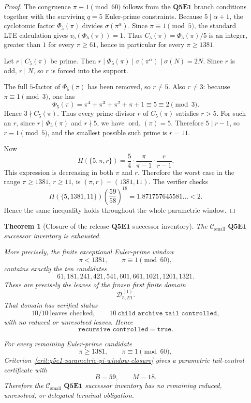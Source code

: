 \documentclass[11pt]{article}
\newtheorem{theorem}{Theorem}[section]
\theoremstyle{definition}
\theoremstyle{remark}
\newcommand{\Csmall}{\ensuremath{\mathcal C_{\mathrm{small}}}}
\begin{document}
\begin{proof}
The congruence \(\pi\equiv1\pmod{60}\) follows from the \(\mathbf{Q5E1}\)
branch conditions together with the surviving \(q=5\) Euler-prime constraints.
Because \(5\mid\alpha+1\), the cyclotomic factor \(\Phi_5(\pi)\) divides
\(\sigma(\pi^\alpha)\).  Since \(\pi\equiv1\pmod5\), the standard LTE
calculation gives \(v_5(\Phi_5(\pi))=1\).  Thus
\(C_5(\pi)=\Phi_5(\pi)/5\) is an integer, greater than \(1\) for every
\(\pi\ge61\), hence in particular for every \(\pi\ge1381\).

Let \(r\mid C_5(\pi)\) be prime.  Then
\(r\mid\Phi_5(\pi)\mid\sigma(\pi^\alpha)\mid\sigma(N)=2N\).  Since \(r\) is
odd, \(r\mid N\), so \(r\) is forced into the support.

The full \(5\)-factor of \(\Phi_5(\pi)\) has been removed, so \(r\ne5\).
Also \(r\ne3\): because \(\pi\equiv1\pmod3\), one has
\[
  \Phi_5(\pi)
  =
  \pi^4+\pi^3+\pi^2+\pi+1
  \equiv
  5
  \equiv2
  \pmod3.
\]
Hence
\(3\nmid C_5(\pi)\).  Thus every prime divisor \(r\) of \(C_5(\pi)\) satisfies
\(r>5\).  For such an \(r\), since \(r\mid\Phi_5(\pi)\) and \(r\nmid5\), we
have \(\operatorname{ord}_r(\pi)=5\).  Therefore \(5\mid r-1\), so
\(r\equiv1\pmod5\), and the smallest possible such prime is \(r=11\).

Now
\[
  H(\{5,\pi,r\})
  =
  \frac54\cdot\frac{\pi}{\pi-1}\cdot\frac{r}{r-1}.
\]
This expression is decreasing in both \(\pi\) and \(r\).  Therefore the worst
case in the range \(\pi\ge1381\), \(r\ge11\), is \((\pi,r)=(1381,11)\).
The verifier checks
\[
  H(\{5,1381,11\})
  \left(\frac{59}{58}\right)^{18}
  =
  1.871757645581\ldots
  <2.
\]
Hence the same inequality holds throughout the whole parametric window.
\end{proof}

\begin{theorem}[Closure of the release \texorpdfstring{\(\mathbf{Q5E1}\)}{Q5E1} successor inventory]
\label{thm:q5e1-current-successor-inventory-closed}
The \(\Csmall\) \(\mathbf{Q5E1}\) successor inventory is exhausted.

More precisely, the finite exceptional Euler-prime window
\[
  \pi<1381,
  \qquad
  \pi\equiv1\pmod{60},
\]
contains exactly the ten candidates
\[
  61,181,241,421,541,601,661,1021,1201,1321.
\]
These are precisely the leaves of the frozen first finite domain
\[
  \mathcal D_{5,E1}^{(1)}.
\]
That domain has verified status
\[
  10/10\ \text{leaves checked},
  \qquad
  10\ \mathtt{child\_archive\_tail\_controlled},
\]
with no reduced or unresolved leaves.  Hence
\[
  \mathtt{recursive\_controlled}=\mathtt{true}.
\]

For every remaining Euler-prime candidate
\[
  \pi\ge1381,
  \qquad
  \pi\equiv1\pmod{60},
\]
Criterion~\ref{crit:q5e1-parametric-pi-window-closure} gives a parametric
tail-control certificate with
\[
  B=59,
  \qquad
  M=18.
\]
Therefore the \(\Csmall\) \(\mathbf{Q5E1}\) successor inventory has no remaining
reduced, unresolved, or delegated terminal obligation.
\end{theorem}
\end{document}
